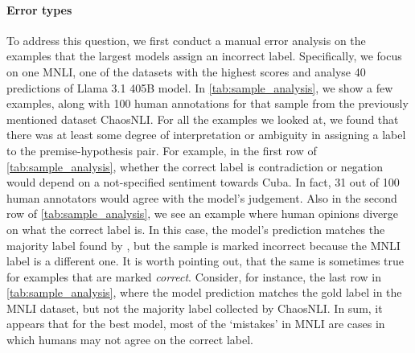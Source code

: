 \paragraph{Error types} To address this question, we first conduct a manual error analysis on the examples that the largest models assign an incorrect label.
Specifically, we focus on one MNLI, one of the datasets with the highest scores and analyse 40 predictions of Llama 3.1 405B model.
In \cref{tab:sample_analysis}, we show a few examples, along with 100 human annotations for that sample from the previously mentioned dataset ChaosNLI.
For all the examples we looked at, we found that there was at least some degree of interpretation or ambiguity in assigning a label to the premise-hypothesis pair.
For example, in the first row of \cref{tab:sample_analysis}, whether the correct label is contradiction or negation would depend on a not-specified sentiment towards Cuba.
In fact, 31 out of 100 human annotators would agree with the model's judgement.
Also in the second row of \cref{tab:sample_analysis}, we see an example where human opinions diverge on what the correct label is.
In this case, the model's prediction matches the majority label found by \citet{nie-etal-2020-learn}, but the sample is marked incorrect because the MNLI label is a different one.
It is worth pointing out, that the same is sometimes true for examples that are marked \emph{correct}.
Consider, for instance, the last row in \cref{tab:sample_analysis}, where the model prediction matches the gold label in the MNLI dataset, but not the majority label collected by ChaosNLI.
In sum, it appears that for the best model, most of the `mistakes' in MNLI are cases in which humans may not agree on the correct label.

